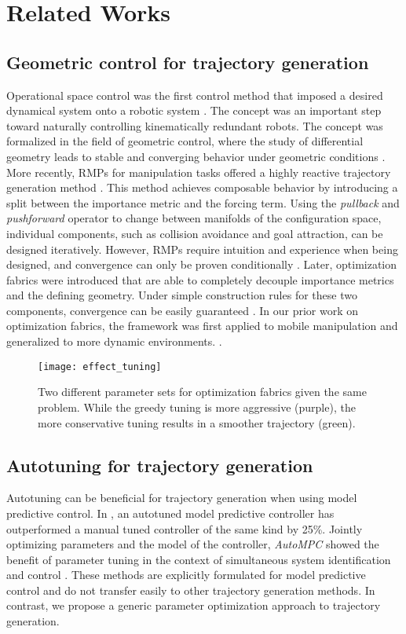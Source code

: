 \section{Related Works}%
\label{sec:related_works}
%
\subsection{Geometric control for trajectory generation}
%
Operational space control was the first control method that imposed
a desired dynamical system onto a robotic system \cite{Khatib1985,Khatib1987}.
The concept was an important step toward naturally controlling 
kinematically redundant robots. The concept was formalized in the field 
of geometric control, where the study of differential geometry leads to 
stable and converging behavior under geometric conditions \cite{bullo2019geometric}.
More recently, RMPs for manipulation tasks offered
a highly reactive trajectory generation method \cite{Ratliff2018,Cheng2020}. This method
achieves composable behavior by introducing a split between the importance metric
and the forcing term. Using the \textit{pullback} and \textit{pushforward} operator
to change between manifolds of the configuration space, individual 
components, such as collision avoidance and goal attraction, can be designed
iteratively. However, RMPs require intuition and 
experience when being designed, and convergence 
can only be proven conditionally \cite{Ratliff2020}. Later, optimization fabrics
were introduced that are able to completely decouple importance metrics
and the defining geometry. Under simple construction rules for these 
two components, convergence can be easily guaranteed \cite{Ratliff2020,Xie2021,Li2021,meng2019neural}.
In our prior work on optimization fabrics, the framework was first applied to
mobile manipulation and generalized to more dynamic environments. \cite{Spahn2023}.
%
\begin{figure}[t]
    \centering
    \texttt{[image: effect\_tuning]}
    \captionsetup{belowskip=-10pt}
    \caption{Two different parameter sets for optimization fabrics given the same problem. While the greedy tuning
    is more aggressive (purple), the more conservative tuning results in a smoother trajectory (green).}
    \label{fig:effect_tuning}
\end{figure}
%

\subsection{Autotuning for trajectory generation}
%
Autotuning can be beneficial for trajectory generation when using model predictive control.
In \cite{loquercio_autotune_2022}, an autotuned
model predictive controller has outperformed a manual tuned controller of the same kind by 
25\%. Jointly optimizing parameters and the model of the controller, \textit{AutoMPC} 
showed the benefit of parameter tuning in the context of simultaneous system
identification and control \cite{edwards_automatic_2021}. These methods are explicitly 
formulated for model predictive control and do not transfer easily to other trajectory generation
methods. In contrast, we propose a generic parameter optimization approach to trajectory generation.

